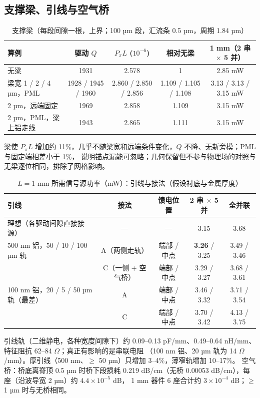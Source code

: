\documentclass[10pt,a4paper]{article}
\begin{document}
\subsection{支撑梁、引线与空气桥}
\begin{table}[H]
\centering\footnotesize
\caption{支撑梁（每段间隙一根，上界；100 µm 段，汇流条 0.5 µm，周期 1.84 µm）}
\begin{tabular}{L{3.4cm}cccc}
\toprule
算例 & 驱动 $Q$ & $P_\pi L$ ($10^{-6}$) & 相对无梁 & 1 mm（2 串 $\times$ 5 并） \\
\midrule
无梁 & 1931 & 2.578 & 1 & 2.85 mW \\
梁宽 1 / 2 / 4 µm，PML & 1928 / 1945 / 1960 & 2.860 / 2.850 / 2.856 & 1.109 / 1.105 / 1.108 & 3.13 / 3.13 / 3.15 mW \\
2 µm，远端固定 & 1969 & 2.858 & 1.109 & 3.15 mW \\
2 µm，PML，梁上铝走线 & 1943 & 2.865 & 1.111 & 3.15 mW \\
\bottomrule
\end{tabular}
\end{table}

梁使 $P_\pi L$ 增加约 11\%，几乎不随梁宽和远端条件变化，$Q$ 不降、无新旁模；PML 与固定端相差小于 1\%，
说明锚点漏能可忽略；几何保留但不参与物理场的对照与无梁逐位相同，排除了网格影响。

\begin{table}[H]
\centering\footnotesize
\caption{$L = 1$ mm 所需信号源功率（mW）：引线与接法（假设衬底与金属厚度）}
\begin{tabular}{L{4.8cm}cccc}
\toprule
引线 & 接法 & 馈电位置 & 2 串 $\times$ 5 并 & 全并联 \\
\midrule
理想（各驱动间隙直接接源） & --- & --- & 3.15 & 3.68 \\
500 nm 铝，50 / 10 / 100 µm 轨 & A（两侧走轨） & 端部 / 中点 & \textbf{3.26} / 3.25 & 3.49 / 3.46 \\
 & C（一侧 + 空气桥） & 端部 / 中点 & 3.29 / 3.27 & 3.68 / 3.61 \\
100 nm 铝，20 / 5 / 50 µm 轨（最差） & A & 端部 / 中点 & 3.46 / 3.32 & 3.71 / 3.54 \\
 & C & 端部 / 中点 & 3.70 / 3.42 & 4.13 / 3.75 \\
\bottomrule
\end{tabular}
\end{table}

引线轨（二维静电，各种宽度间隙下）约 0.09--0.13 pF/mm、0.49--0.64 nH/mm、特征阻抗 62--84 $\Omega$；真正有影响的是串联电阻
（100 nm 铝、20 µm 轨为 14 $\Omega$/mm）。厚引线（500 nm、$\ge$ 50 µm）只增加 3--4\%，薄窄轨增加 10--17\%。
空气桥：桥底离脊顶 0.5 µm 时桥下段损耗 0.219 dB/cm（无桥 0.00053 dB/cm），每座（沿波导宽 2 µm）约 $4.4\times10^{-5}$ dB，
1 mm 器件 6 座合计约 $3\times10^{-4}$ dB；$\ge$ 1 µm 时与无桥相同。
\end{document}
